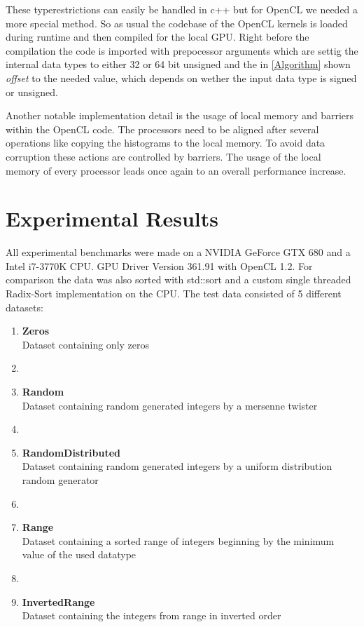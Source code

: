 \documentclass{llncs}
\begin{document}
These typerestrictions can easily be handled in c++ but for OpenCL we needed a more special method. So as usual the codebase of the OpenCL kernels is loaded during runtime and then compiled for the local GPU. Right before the compilation the code is imported with prepocessor arguments which are settig the internal data types to either 32 or 64 bit unsigned and the in \ref{Algorithm} shown \textit{offset} to the needed value, which depends on wether the input data type is signed or unsigned.

Another notable implementation detail is the usage of local memory and barriers within the OpenCL code. The processors need to be aligned after several operations like copying the histograms to the local memory. To avoid data corruption these actions are controlled by barriers. The usage of the local memory of every processor leads once again to an overall performance increase.

\newpage
\section{Experimental Results}
All experimental benchmarks were made on a NVIDIA GeForce GTX 680 and a Intel i7-3770K CPU. GPU Driver Version 361.91 with OpenCL 1.2. For comparison the data was also sorted with std::sort and a custom single threaded Radix-Sort implementation on the CPU. The test data consisted of 5 different datasets:

\begin{enumerate}
  \item \textbf{Zeros}\\ Dataset containing only zeros
  \item[]
  \item \textbf{Random}\\ Dataset containing random generated integers by a mersenne twister
  \item[]
  \item \textbf{RandomDistributed}\\  Dataset containing random generated integers by a uniform distribution random generator
  \item[]
  \item \textbf{Range}\\ Dataset containing a sorted range of integers beginning by the minimum value of the used datatype
  \item[]
  \item \textbf{InvertedRange}\\ Dataset containing the integers from range in inverted order
\end{enumerate}
\end{document}
